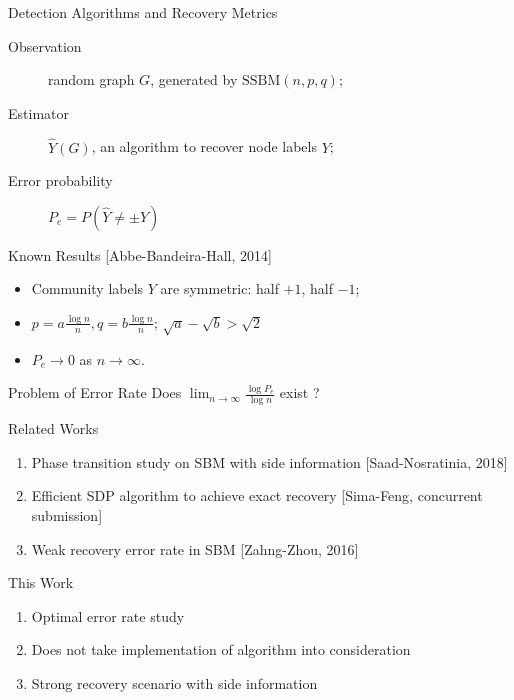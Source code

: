 \documentclass{beamer}
\begin{document}
\begin{frame}{Detection Algorithms and Recovery Metrics}
	\begin{description}
		\item[Observation] random graph $G$, generated by $\textrm{SSBM}(n,p,q)$;
		\item[Estimator] $\hat{Y}(G)$, an algorithm to recover node labels $Y$;
		\item[Error probability] $P_e=P(\hat{Y} \neq \pm Y)$
	\end{description}
	
	\begin{block}{Known Results [Abbe-Bandeira-Hall, 2014]}
		\begin{itemize}
		\item Community labels $Y$ are symmetric: half $+1$, half $-1$;
		\item $p = a\frac{ \log n}{n}, q = b \frac{ \log n}{n}$;
		$\sqrt{a} - \sqrt{b} > \sqrt{2}$
		\item $P_e \to 0$ as $n \to \infty$.
		\end{itemize}
	\end{block}
	\begin{block}{Problem of Error Rate}
	 Does $\lim_{n \to \infty}\frac{\log P_e}{\log n}$
	 exist ?
	\end{block}
\end{frame}
\begin{frame}{Related Works}
	\begin{enumerate}
		\item Phase transition study on SBM with side information
		[Saad-Nosratinia, 2018]
		\item Efficient SDP algorithm to achieve exact recovery
		[Sima-Feng, concurrent submission]
		\item Weak recovery error rate in SBM
		[Zahng-Zhou, 2016]
	\end{enumerate}
	\begin{block}{This Work}
		\begin{enumerate}
			\item Optimal error rate study
			\item Does not take implementation of algorithm into consideration
			\item Strong recovery scenario with side information
		\end{enumerate}
	\end{block}
\end{frame}
\end{document}
